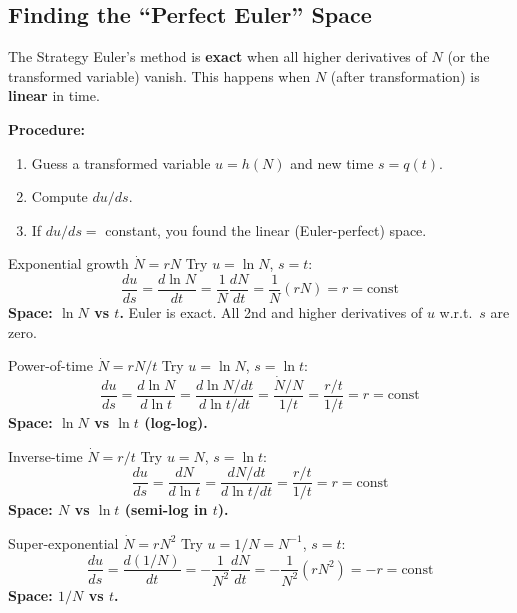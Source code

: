 \documentclass[10pt]{article}
\begin{document}
\subsection{Finding the ``Perfect Euler'' Space}

\begin{rulebox}{The Strategy}
Euler's method is \textbf{exact} when all higher derivatives of $N$ (or the transformed variable) vanish. This happens when $N$ (after transformation) is \textbf{linear} in time.

\textbf{Procedure:}
\begin{enumerate}
  \item Guess a transformed variable $u = h(N)$ and new time $s = q(t)$.
  \item Compute $du/ds$.
  \item If $du/ds = $ constant, you found the linear (Euler-perfect) space.
\end{enumerate}
\end{rulebox}

\begin{exbox}{Exponential growth $\dot N = rN$}
Try $u = \ln N$, $s = t$:
\[
\frac{du}{ds} = \frac{d\ln N}{dt} = \frac{1}{N}\frac{dN}{dt} = \frac{1}{N}(rN) = r = \text{const}
\]
\textbf{Space: $\ln N$ vs $t$.} Euler is exact. All 2nd and higher derivatives of $u$ w.r.t.\ $s$ are zero.
\end{exbox}

\begin{exbox}{Power-of-time $\dot N = rN/t$}
Try $u = \ln N$, $s = \ln t$:
\[
\frac{du}{ds} = \frac{d\ln N}{d\ln t} = \frac{d\ln N/dt}{d\ln t/dt} = \frac{\dot N/N}{1/t} = \frac{r/t}{1/t} = r = \text{const}
\]
\textbf{Space: $\ln N$ vs $\ln t$ (log-log).}
\end{exbox}

\begin{exbox}{Inverse-time $\dot N = r/t$}
Try $u = N$, $s = \ln t$:
\[
\frac{du}{ds} = \frac{dN}{d\ln t} = \frac{dN/dt}{d\ln t/dt} = \frac{r/t}{1/t} = r = \text{const}
\]
\textbf{Space: $N$ vs $\ln t$ (semi-log in $t$).}
\end{exbox}

\begin{exbox}{Super-exponential $\dot N = rN^2$}
Try $u = 1/N = N^{-1}$, $s = t$:
\[
\frac{du}{ds} = \frac{d(1/N)}{dt} = -\frac{1}{N^2}\frac{dN}{dt} = -\frac{1}{N^2}(rN^2) = -r = \text{const}
\]
\textbf{Space: $1/N$ vs $t$.}
\end{exbox}

\end{document}

